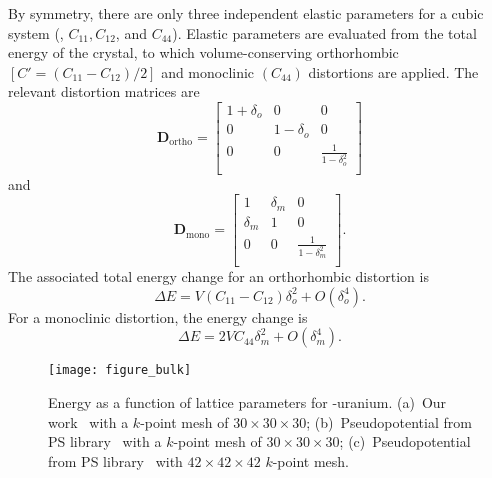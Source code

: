 \begin{appendices}
By symmetry, there are only three independent elastic parameters for a cubic system (\ie, $C_{11}, C_{12}$, and $ C_{44}$).
Elastic parameters are evaluated from the total energy of the crystal, to which volume-conserving orthorhombic $[C'=(C_{11} - C_{12})/2]$ and monoclinic $(C_{44})$ distortions are applied. The relevant distortion matrices are 
\begin{equation}
\mathbf{D}_\text{ortho} = \label{eq:ortho}
		\begin{bmatrix}
		1+\delta_o & 0 & 0 \\
		0 & 1-\delta_o & 0 \\
		0 & 0 & \frac{1}{1-\delta_o^2}\\
		\end{bmatrix}
\end{equation}
and
\begin{equation}
\label{eq:mono}
\mathbf{D}_\text{mono} = \begin{bmatrix}
	1 & \delta_m & 0 \\
	\delta_m & 1 & 0 \\
	0 & 0 & \frac{1}{1-\delta_m^2} \\
\end{bmatrix}.
\end{equation}
The associated total energy change for an orthorhombic distortion is 
\begin{equation}
\label{eq_ortho}
\Delta E = V(C_{11} - C_{12})\delta_o^2 + O(\delta_o^4) .
\end{equation}
For a monoclinic distortion, the energy change is
\begin{equation}
\label{eq_mono}
\Delta E = 2VC_{44}\delta_m^2 + O(\delta_m^4).
\end{equation}

\begin{figure}
	\centering
	\texttt{[image: figure\_bulk]}
    \caption[Energy as a function of lattice parameters for \textgamma-uranium.]{Energy as a function of lattice parameters for \textgamma-uranium. (a)~Our work~\cite{iasir2020pseudopotential} with a $k$-point mesh of $30\times30\times30$; (b)~Pseudopotential from PS library~\cite{dal2014pseudopotentials, pp1}
 with a $k$-point mesh of $30\times30\times30$; (c)~Pseudopotential from PS library~\cite{dal2014pseudopotentials, pp1}
 with $42\times42\times42$ $k$-point mesh.}
	\label{fig:bulkgamma}
\end{figure}


\end{appendices}
